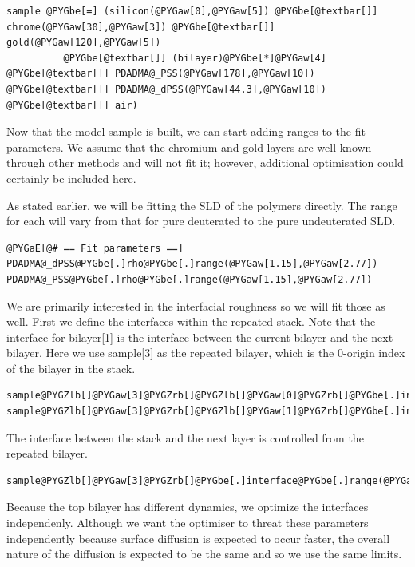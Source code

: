 \documentclass[letterpaper,10pt,english]{sphinxmanual}
\begin{document}
\begin{Verbatim}[commandchars=@\[\]]
sample @PYGbe[=] (silicon(@PYGaw[0],@PYGaw[5]) @PYGbe[@textbar[]] chrome(@PYGaw[30],@PYGaw[3]) @PYGbe[@textbar[]] gold(@PYGaw[120],@PYGaw[5])
          @PYGbe[@textbar[]] (bilayer)@PYGbe[*]@PYGaw[4] @PYGbe[@textbar[]] PDADMA@_PSS(@PYGaw[178],@PYGaw[10]) @PYGbe[@textbar[]] PDADMA@_dPSS(@PYGaw[44.3],@PYGaw[10]) @PYGbe[@textbar[]] air)
\end{Verbatim}

Now that the model sample is built, we can start adding ranges to the fit
parameters. We assume that the chromium and gold layers are well known through
other methods and will not fit it; however, additional optimisation could
certainly be included here.

As stated earlier, we will be fitting the SLD of the polymers directly.
The range for each will vary from that for pure deuterated to the
pure undeuterated SLD.

\begin{Verbatim}[commandchars=@\[\]]
@PYGaE[@# == Fit parameters ==]
PDADMA@_dPSS@PYGbe[.]rho@PYGbe[.]range(@PYGaw[1.15],@PYGaw[2.77])
PDADMA@_PSS@PYGbe[.]rho@PYGbe[.]range(@PYGaw[1.15],@PYGaw[2.77])
\end{Verbatim}

We are primarily interested in the interfacial roughness so we will
fit those as well.  First we define the interfaces within the repeated
stack.  Note that the interface for bilayer{[}1{]} is the interface between
the current bilayer and the next bilayer.   Here we use sample{[}3{]} as
the repeated bilayer, which is the 0-origin index of the bilayer in the
stack.

\begin{Verbatim}[commandchars=@\[\]]
sample@PYGZlb[]@PYGaw[3]@PYGZrb[]@PYGZlb[]@PYGaw[0]@PYGZrb[]@PYGbe[.]interface@PYGbe[.]range(@PYGaw[5],@PYGaw[45])
sample@PYGZlb[]@PYGaw[3]@PYGZrb[]@PYGZlb[]@PYGaw[1]@PYGZrb[]@PYGbe[.]interface@PYGbe[.]range(@PYGaw[5],@PYGaw[45])
\end{Verbatim}

The interface between the stack and the next layer is controlled from
the repeated bilayer.

\begin{Verbatim}[commandchars=@\[\]]
sample@PYGZlb[]@PYGaw[3]@PYGZrb[]@PYGbe[.]interface@PYGbe[.]range(@PYGaw[5],@PYGaw[45])
\end{Verbatim}

Because the top bilayer has different dynamics, we optimize the interfaces
independenly. Although we want the optimiser to threat these parameters
independently because surface diffusion is expected to occur faster, the
overall nature of the diffusion is expected to be the same and so we use the
same limits.
\end{document}
